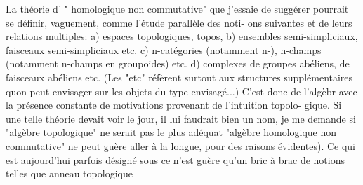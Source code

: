 La théorie d' " homologique non commutative" que j'essaie de
suggérer pourrait se définir, vaguement, comme l'étude parallèle des noti-%
ons suivantes et de leurs relations multiples: a) espaces topologiques,
topos, b) ensembles semi-simpliciaux, faisceaux semi-simpliciaux etc.
c) n-catégories (notamment n-), n-champs (notamment n-champs en
groupoides) etc. d) complexes de groupes abéliens, de faisceaux abéliens
etc. (Les "etc" réfèrent surtout aux structures supplémentaires quon 
peut envisager sur les objets du type envisagé...) C'est donc de l'algèbr
avec la présence constante de motivations provenant de l'intuition topolo-%
gique. Si une telle théorie devait voir le jour, il lui faudrait bien un
nom, je me demande si "algèbre topologique" ne serait pas le plus adéquat
\hand{(}"algèbre homologique non commutative" ne peut guère aller à la longue, pour
des raisons évidentes). Ce qui est aujourd'hui parfois désigné sous ce
n'est guère qu'un bric à brac de notions \hand{(}telles que anneau topologique

